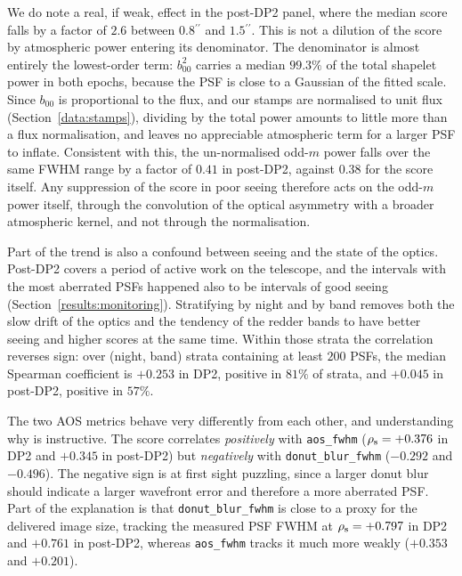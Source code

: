 \documentclass[]{spie}
\newcommand{\arcsec}{\ensuremath{^{\prime\prime}}}
\begin{document}
We do note a real, if weak, effect in the post-DP2 panel, where the median score falls by a
factor of $2.6$ between $0.8\arcsec$ and $1.5\arcsec$. This is not a dilution of the score
by atmospheric power entering its denominator. The denominator is almost entirely the
lowest-order term: $b_{00}^2$ carries a median $99.3\%$ of the total shapelet power in both
epochs, because the PSF is close to a Gaussian of the fitted scale. Since $b_{00}$ is
proportional to the flux, and our stamps are normalised to unit flux
(Section~\ref{data:stamps}), dividing by the total power amounts to little more than a flux
normalisation, and leaves no appreciable atmospheric term for a larger PSF to inflate.
Consistent with this, the un-normalised odd-$m$ power falls over the same FWHM range by a
factor of $0.41$ in post-DP2, against $0.38$ for the score itself. Any suppression of the
score in poor seeing therefore acts on the odd-$m$ power itself, through the convolution of
the optical asymmetry with a broader atmospheric kernel, and not through the normalisation.

Part of the trend is also a confound between seeing and the state of the optics. Post-DP2
covers a period of active work on the telescope, and the intervals with the most aberrated
PSFs happened also to be intervals of good seeing (Section~\ref{results:monitoring}).
Stratifying by night and by band removes both the slow drift of the optics and the tendency
of the redder bands to have better seeing and higher scores at the same time. Within those
strata the correlation reverses sign: over (night, band) strata containing at least $200$
PSFs, the median Spearman coefficient is $+0.253$ in DP2, positive in $81\%$ of strata, and
$+0.045$ in post-DP2, positive in $57\%$.

The two AOS metrics behave very differently from each other, and understanding why is
instructive. The score correlates \emph{positively} with \texttt{aos\_fwhm}
($\rho_{\rm s} = +0.376$ in DP2 and $+0.345$ in post-DP2) but \emph{negatively} with
\texttt{donut\_blur\_fwhm} ($-0.292$ and $-0.496$). The negative sign is at first sight
puzzling, since a larger donut blur should indicate a larger wavefront error and therefore
a more aberrated PSF. Part of the explanation is that \texttt{donut\_blur\_fwhm} is close
to a proxy for the delivered image size, tracking the measured PSF FWHM at
$\rho_{\rm s} = +0.797$ in DP2 and $+0.761$ in post-DP2, whereas \texttt{aos\_fwhm} tracks
it much more weakly ($+0.353$ and $+0.201$).
\end{document}
